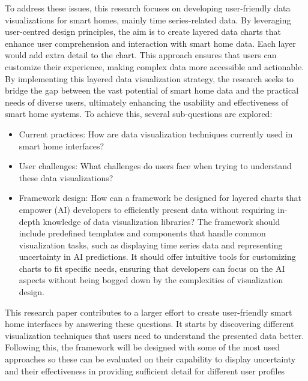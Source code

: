 \documentclass[journal]{IEEEtran}
\begin{document}
To address these issues, this research focuses on developing user-friendly data visualizations for smart homes, mainly time series-related data. By leveraging user-centred design principles, the aim is to create layered data charts that enhance user comprehension and interaction with smart home data. Each layer would add extra detail to the chart. This approach ensures that users can customize their experience, making complex data more accessible and actionable. By implementing this layered data visualization strategy, the research seeks to bridge the gap between the vast potential of smart home data and the practical needs of diverse users, ultimately enhancing the usability and effectiveness of smart home systems. To achieve this, several sub-questions are explored:

\begin{itemize}
\item Current practices: How are data visualization techniques currently used in smart home interfaces?
\item User challenges: What challenges do users face when trying to understand these data visualizations?
\item Framework design: How can a framework be designed for layered charts that empower (AI) developers to efficiently present data without requiring in-depth knowledge of data visualization libraries? The framework should include predefined templates and components that handle common visualization tasks, such as displaying time series data and representing uncertainty in AI predictions. It should offer intuitive tools for customizing charts to fit specific needs, ensuring that developers can focus on the AI aspects without being bogged down by the complexities of visualization design.
\end{itemize}

This research paper contributes to a larger effort to create user-friendly smart home interfaces by answering these questions. It starts by discovering different visualization techniques that users need to understand the presented data better. Following this, the framework will be designed with some of the most used approaches so these can be evaluated on their capability to display uncertainty and their effectiveness in providing sufficient detail for different user profiles
\end{document}
